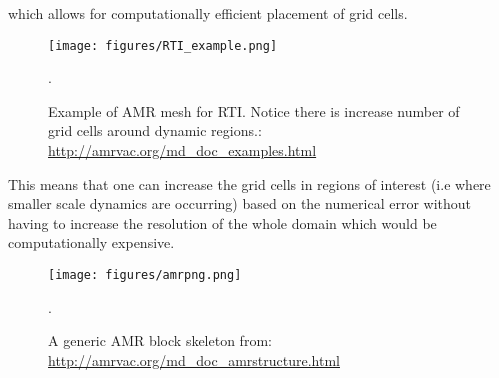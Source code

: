 which allows for computationally efficient placement of grid cells. 
\begin{figure}
\centering
\texttt{[image: figures/RTI\_example.png]}
\caption{Example of AMR mesh for RTI. Notice there is increase number of grid cells around dynamic regions.: \url{http://amrvac.org/md_doc_examples.html}}.
\label{amr_example}
\end{figure}   
This means that one can increase the grid cells in regions of interest (i.e where smaller scale dynamics are occurring) based on the numerical error without having to increase the resolution of the whole domain which would be computationally expensive. \np
\begin{figure}
\centering
\texttt{[image: figures/amrpng.png]}
\caption{A generic AMR block skeleton from: \url{http://amrvac.org/md_doc_amrstructure.html}}.
\label{amr_scheme}
\end{figure}   
